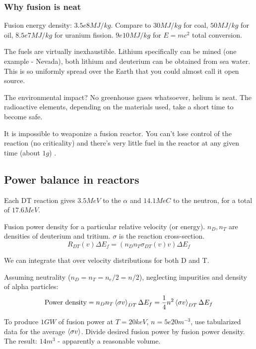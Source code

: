 \documentclass[PlasmaNotes.tex]{subfiles}
\begin{document}
\subsubsection{Why fusion is neat}

Fusion energy density: $3.5e8 MJ/kg$. Compare to $30 MJ/kg$ for coal, $50 MJ/kg$ for oil, $8.5e7 MJ/kg$ for uranium fission. $9e10 MJ/kg$ for $E=mc^2$ total conversion.

The fuels are virtually inexhaustible. Lithium specifically can be mined (one example - Nevada), both lithium and deuterium can be obtained from sea water. This is so uniformly spread over the Earth that you could almost call it open source.

The environmental impact? No greenhouse gases whatsoever, helium is neat. The radioactive elements, depending on the materials used, take a short time to become safe.

It is impossible to weaponize a fusion reactor. You can't lose control of the reaction (no criticality) and there's very little fuel in the reactor at any given time (about $1g$) .

\subsection{Power balance in reactors}

Each DT reaction gives $3.5 MeV$ to the $\alpha$ and $14.1 MeC$ to the neutron, for a total of $17.6 MeV$.

Fusion power density for a particular relative velocity (or energy). $n_D, n_T$ are densities of deuterium and tritium. $\sigma$ is the reaction cross-section.
\begin{equation}
R_{DT}(v) \Delta E_f = (n_D n_T \sigma_{DT} (v) v) \Delta E_f
\end{equation}

We can integrate that over velocity distributions for both D and T.

Assuming neutrality ($n_D=n_T=n_e/2=n/2$), neglecting impurities and density of alpha particles:
\begin{equation}
\text{Power density} = n_D n_T \left< \sigma v \right>_{DT} \Delta E_f = \frac{1}{4} n^2 \left< \sigma v \right>_{DT} \Delta E_f
\end{equation}

To produce $1GW$ of fusion power at $T=20keV$, $n=5e20 m^{-3}$, use tabularized data for the average $\left< \sigma v \right>$. Divide desired fusion power by fusion power density. The result: $14 m^3$ - apparently a reasonable volume.
\end{document}
